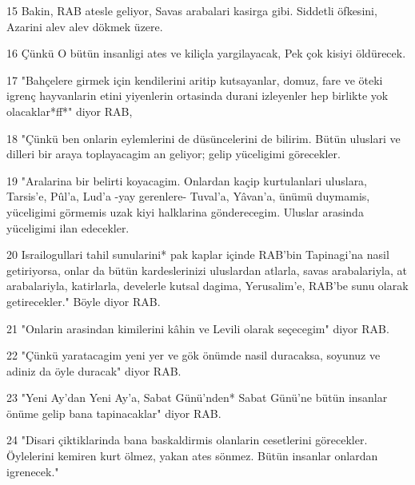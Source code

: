 \par 15 Bakin, RAB atesle geliyor, Savas arabalari kasirga gibi. Siddetli öfkesini, Azarini alev alev dökmek üzere.
\par 16 Çünkü O bütün insanligi ates ve kiliçla yargilayacak, Pek çok kisiyi öldürecek.
\par 17 "Bahçelere girmek için kendilerini aritip kutsayanlar, domuz, fare ve öteki igrenç hayvanlarin etini yiyenlerin ortasinda durani izleyenler hep birlikte yok olacaklar*ff*" diyor RAB,
\par 18 "Çünkü ben onlarin eylemlerini de düsüncelerini de bilirim. Bütün uluslari ve dilleri bir araya toplayacagim an geliyor; gelip yüceligimi görecekler.
\par 19 "Aralarina bir belirti koyacagim. Onlardan kaçip kurtulanlari uluslara, Tarsis'e, Pûl'a, Lud'a -yay gerenlere- Tuval'a, Yâvan'a, ünümü duymamis, yüceligimi görmemis uzak kiyi halklarina gönderecegim. Uluslar arasinda yüceligimi ilan edecekler.
\par 20 Israilogullari tahil sunularini* pak kaplar içinde RAB'bin Tapinagi'na nasil getiriyorsa, onlar da bütün kardeslerinizi uluslardan atlarla, savas arabalariyla, at arabalariyla, katirlarla, develerle kutsal dagima, Yerusalim'e, RAB'be sunu olarak getirecekler." Böyle diyor RAB.
\par 21 "Onlarin arasindan kimilerini kâhin ve Levili olarak seçecegim" diyor RAB.
\par 22 "Çünkü yaratacagim yeni yer ve gök önümde nasil duracaksa, soyunuz ve adiniz da öyle duracak" diyor RAB.
\par 23 "Yeni Ay'dan Yeni Ay'a, Sabat Günü'nden* Sabat Günü'ne bütün insanlar önüme gelip bana tapinacaklar" diyor RAB.
\par 24 "Disari çiktiklarinda bana baskaldirmis olanlarin cesetlerini görecekler. Öylelerini kemiren kurt ölmez, yakan ates sönmez. Bütün insanlar onlardan igrenecek."


